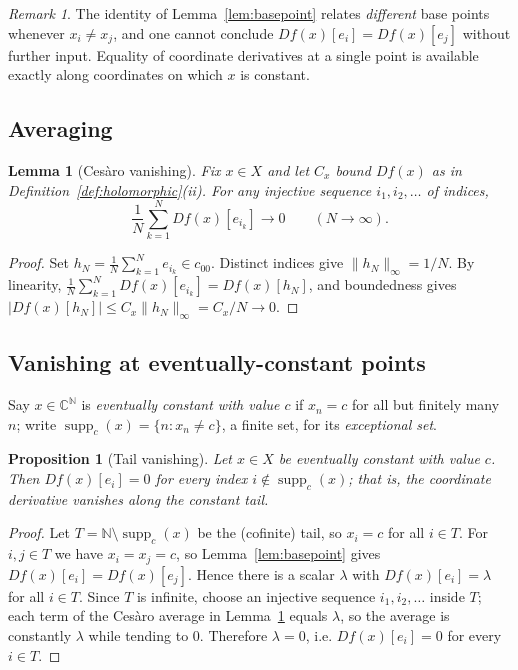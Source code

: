 \documentclass[11pt]{amsart}
\newcommand{\NN}{\mathbb{N}}
\newcommand{\CC}{\mathbb{C}}
\newcommand{\cc}{c_{00}}
\DeclareMathOperator{\supp}{supp}
\theoremstyle{plain}
\newtheorem{proposition}[theorem]{Proposition}
\newtheorem{lemma}[theorem]{Lemma}
\theoremstyle{definition}
\theoremstyle{remark}
\newtheorem{remark}[theorem]{Remark}
\begin{document}
\begin{remark}
The identity of Lemma~\ref{lem:basepoint} relates \emph{different} base
points whenever $x_i\ne x_j$, and one cannot conclude
$Df(x)[e_i]=Df(x)[e_j]$ without further input. Equality of coordinate
derivatives at a single point is available exactly along coordinates on
which $x$ is constant.
\end{remark}

\subsection{Averaging}

\begin{lemma}[Ces\`aro vanishing]
\label{lem:cesaro}
Fix $x\in X$ and let $C_x$ bound $Df(x)$ as in
Definition~\ref{def:holomorphic}(ii). For any injective sequence
$i_1,i_2,\ldots$ of indices,
\[
  \frac{1}{N}\sum_{k=1}^N Df(x)[e_{i_k}] \longrightarrow 0
  \qquad (N\to\infty).
\]
\end{lemma}

\begin{proof}
Set $h_N=\tfrac1N\sum_{k=1}^N e_{i_k}\in\cc$. Distinct indices give
$\|h_N\|_\infty=1/N$. By linearity, $\tfrac1N\sum_{k=1}^N
Df(x)[e_{i_k}]=Df(x)[h_N]$, and boundedness gives
$|Df(x)[h_N]|\le C_x\|h_N\|_\infty=C_x/N\to0$.
\end{proof}

\subsection{Vanishing at eventually-constant points}

Say $x\in\CC^\NN$ is \emph{eventually constant with value $c$} if
$x_n=c$ for all but finitely many $n$; write $\supp_c(x)=\{n:x_n\ne c\}$,
a finite set, for its \emph{exceptional set}.

\begin{proposition}[Tail vanishing]
\label{prop:tail}
Let $x\in X$ be eventually constant with value $c$. Then $Df(x)[e_i]=0$ for
every index $i\notin\supp_c(x)$; that is, the coordinate derivative
vanishes along the constant tail.
\end{proposition}

\begin{proof}
Let $T=\NN\setminus\supp_c(x)$ be the (cofinite) tail, so $x_i=c$ for all
$i\in T$. For $i,j\in T$ we have $x_i=x_j=c$, so
Lemma~\ref{lem:basepoint} gives $Df(x)[e_i]=Df(x)[e_j]$. Hence there is a
scalar $\lambda$ with $Df(x)[e_i]=\lambda$ for all $i\in T$. Since $T$ is
infinite, choose an injective sequence $i_1,i_2,\ldots$ inside $T$; each
term of the Ces\`aro average in Lemma~\ref{lem:cesaro} equals $\lambda$, so
the average is constantly $\lambda$ while tending to $0$. Therefore
$\lambda=0$, i.e. $Df(x)[e_i]=0$ for every $i\in T$.
\end{proof}
\end{document}
